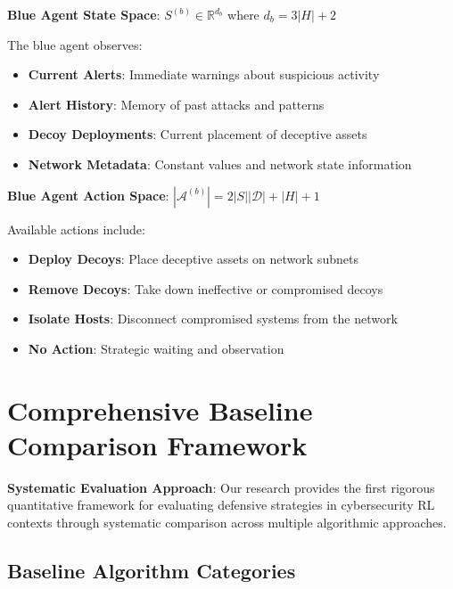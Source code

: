 \documentclass[11pt]{article}
\begin{document}
\begin{mathdetails}
\textbf{Blue Agent State Space}: $S^{(b)} \in \mathbb{R}^{d_b}$ where $d_b = 3|H| + 2$

The blue agent observes:
\begin{itemize}
\item \textbf{Current Alerts}: Immediate warnings about suspicious activity
\item \textbf{Alert History}: Memory of past attacks and patterns
\item \textbf{Decoy Deployments}: Current placement of deceptive assets
\item \textbf{Network Metadata}: Constant values and network state information
\end{itemize}

\textbf{Blue Agent Action Space}: $|\mathcal{A}^{(b)}| = 2|S||\mathcal{D}| + |H| + 1$

Available actions include:
\begin{itemize}
\item \textbf{Deploy Decoys}: Place deceptive assets on network subnets
\item \textbf{Remove Decoys}: Take down ineffective or compromised decoys
\item \textbf{Isolate Hosts}: Disconnect compromised systems from the network
\item \textbf{No Action}: Strategic waiting and observation
\end{itemize}
\end{mathdetails}

\section{Comprehensive Baseline Comparison Framework}

\begin{foundation}
\textbf{Systematic Evaluation Approach}: Our research provides the first rigorous quantitative framework for evaluating defensive strategies in cybersecurity RL contexts through systematic comparison across multiple algorithmic approaches.
\end{foundation}

\subsection{Baseline Algorithm Categories}
\end{document}
